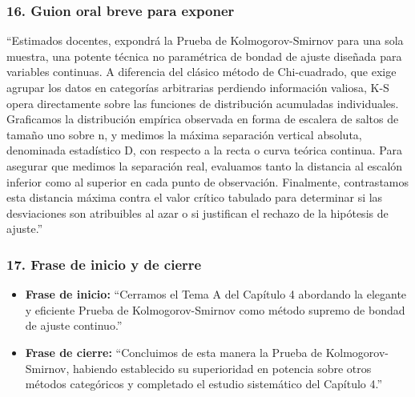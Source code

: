 \documentclass[11pt,a4paper]{article}
\begin{document}
\subsubsection{16. Guion oral breve para exponer}
\begin{guion}
    ``Estimados docentes, expondrá la Prueba de Kolmogorov-Smirnov para una sola muestra, una potente técnica no paramétrica de bondad de ajuste diseñada para variables continuas. A diferencia del clásico método de Chi-cuadrado, que exige agrupar los datos en categorías arbitrarias perdiendo información valiosa, K-S opera directamente sobre las funciones de distribución acumuladas individuales. Graficamos la distribución empírica observada en forma de escalera de saltos de tamaño uno sobre n, y medimos la máxima separación vertical absoluta, denominada estadístico D, con respecto a la recta o curva teórica continua. Para asegurar que medimos la separación real, evaluamos tanto la distancia al escalón inferior como al superior en cada punto de observación. Finalmente, contrastamos esta distancia máxima contra el valor crítico tabulado para determinar si las desviaciones son atribuibles al azar o si justifican el rechazo de la hipótesis de ajuste.''
\end{guion}

\subsubsection{17. Frase de inicio y de cierre}
\begin{itemize}
    \item \textbf{Frase de inicio:} ``Cerramos el Tema A del Capítulo 4 abordando la elegante y eficiente Prueba de Kolmogorov-Smirnov como método supremo de bondad de ajuste continuo.''
    \item \textbf{Frase de cierre:} ``Concluimos de esta manera la Prueba de Kolmogorov-Smirnov, habiendo establecido su superioridad en potencia sobre otros métodos categóricos y completado el estudio sistemático del Capítulo 4.''
\end{itemize}
\end{document}
